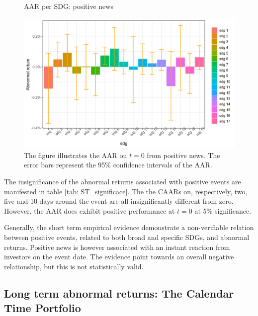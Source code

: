 \begin{figure} [H]
    \centering
    \caption{AAR per SDG: positive news}
    \includegraphics[scale=0.6]{Projekt/1.Figures analysis/ST_positive_sdg_bar.png}
    \caption*{\footnotesize The figure illustrates the AAR on $t = 0$ from positive news. The error bars represent the 95\% confidence intervals of the AAR.}
    \label{fig:ST_pos_bar}
\end{figure}

The insignificance of the abnormal returns associated with positive events are manifested in table \ref{tab: ST_significace}. The the CAARs on, respectively, two, five and 10 days around the event are all insignificantly different from zero. However, the AAR does exhibit positive performance at $t = 0$ at 5\% significance.  

Generally, the short term empirical evidence demonstrate a non-verifiable relation between positive events, related to both broad and specific SDGs, and abnormal returns. Positive news is however associated with an instant reaction from investors on the event date. The evidence point towards an overall negative relationship, but this is not statistically valid.  



\subsection{Long term abnormal returns: The Calendar Time Portfolio}

